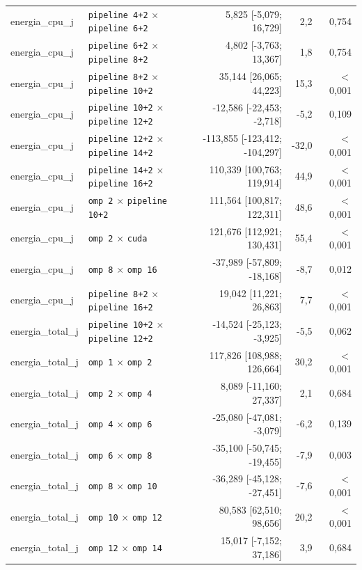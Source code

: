 \begin{tabular}{llrrr}
energia\_cpu\_j & \texttt{pipeline 4+2} $\times$ \texttt{pipeline 6+2} & 5,825 [-5,079; 16,729] & 2,2 & 0,754 \\
energia\_cpu\_j & \texttt{pipeline 6+2} $\times$ \texttt{pipeline 8+2} & 4,802 [-3,763; 13,367] & 1,8 & 0,754 \\
energia\_cpu\_j & \texttt{pipeline 8+2} $\times$ \texttt{pipeline 10+2} & 35,144 [26,065; 44,223] & 15,3 & $<$0,001 \\
energia\_cpu\_j & \texttt{pipeline 10+2} $\times$ \texttt{pipeline 12+2} & -12,586 [-22,453; -2,718] & -5,2 & 0,109 \\
energia\_cpu\_j & \texttt{pipeline 12+2} $\times$ \texttt{pipeline 14+2} & -113,855 [-123,412; -104,297] & -32,0 & $<$0,001 \\
energia\_cpu\_j & \texttt{pipeline 14+2} $\times$ \texttt{pipeline 16+2} & 110,339 [100,763; 119,914] & 44,9 & $<$0,001 \\
energia\_cpu\_j & \texttt{omp 2} $\times$ \texttt{pipeline 10+2} & 111,564 [100,817; 122,311] & 48,6 & $<$0,001 \\
energia\_cpu\_j & \texttt{omp 2} $\times$ \texttt{cuda} & 121,676 [112,921; 130,431] & 55,4 & $<$0,001 \\
energia\_cpu\_j & \texttt{omp 8} $\times$ \texttt{omp 16} & -37,989 [-57,809; -18,168] & -8,7 & 0,012 \\
energia\_cpu\_j & \texttt{pipeline 8+2} $\times$ \texttt{pipeline 16+2} & 19,042 [11,221; 26,863] & 7,7 & $<$0,001 \\
energia\_total\_j & \texttt{pipeline 10+2} $\times$ \texttt{pipeline 12+2} & -14,524 [-25,123; -3,925] & -5,5 & 0,062 \\
energia\_total\_j & \texttt{omp 1} $\times$ \texttt{omp 2} & 117,826 [108,988; 126,664] & 30,2 & $<$0,001 \\
energia\_total\_j & \texttt{omp 2} $\times$ \texttt{omp 4} & 8,089 [-11,160; 27,337] & 2,1 & 0,684 \\
energia\_total\_j & \texttt{omp 4} $\times$ \texttt{omp 6} & -25,080 [-47,081; -3,079] & -6,2 & 0,139 \\
energia\_total\_j & \texttt{omp 6} $\times$ \texttt{omp 8} & -35,100 [-50,745; -19,455] & -7,9 & 0,003 \\
energia\_total\_j & \texttt{omp 8} $\times$ \texttt{omp 10} & -36,289 [-45,128; -27,451] & -7,6 & $<$0,001 \\
energia\_total\_j & \texttt{omp 10} $\times$ \texttt{omp 12} & 80,583 [62,510; 98,656] & 20,2 & $<$0,001 \\
energia\_total\_j & \texttt{omp 12} $\times$ \texttt{omp 14} & 15,017 [-7,152; 37,186] & 3,9 & 0,684 \\

\end{tabular}

